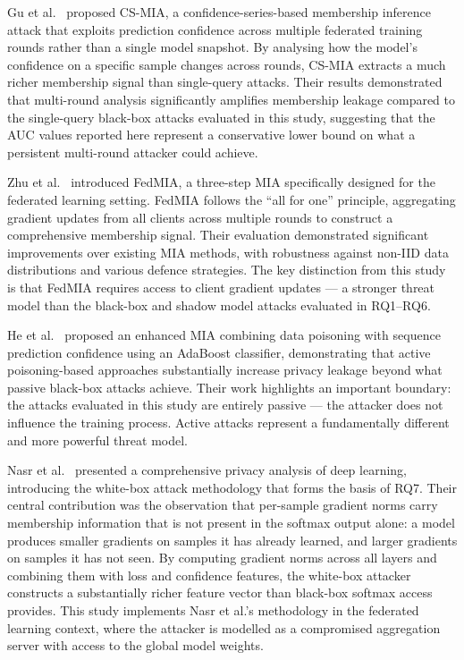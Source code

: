 \documentclass[12pt, a4paper]{report}
\begin{document}
Gu et al.~\cite{gu2022} proposed CS-MIA, a confidence-series-based membership
inference attack that exploits prediction confidence across multiple federated
training rounds rather than a single model snapshot. By analysing how the model's
confidence on a specific sample changes across rounds, CS-MIA extracts a much
richer membership signal than single-query attacks. Their results demonstrated
that multi-round analysis significantly amplifies membership leakage compared to
the single-query black-box attacks evaluated in this study, suggesting that the
AUC values reported here represent a conservative lower bound on what a persistent
multi-round attacker could achieve.

Zhu et al.~\cite{zhu2024fedmia} introduced FedMIA, a three-step MIA specifically
designed for the federated learning setting. FedMIA follows the ``all for one''
principle, aggregating gradient updates from all clients across multiple rounds
to construct a comprehensive membership signal. Their evaluation demonstrated
significant improvements over existing MIA methods, with robustness against
non-IID data distributions and various defence strategies. The key distinction
from this study is that FedMIA requires access to client gradient updates --- a
stronger threat model than the black-box and shadow model attacks evaluated in
RQ1--RQ6.

He et al.~\cite{he2024} proposed an enhanced MIA combining data poisoning with
sequence prediction confidence using an AdaBoost classifier, demonstrating that
active poisoning-based approaches substantially increase privacy leakage beyond
what passive black-box attacks achieve. Their work highlights an important
boundary: the attacks evaluated in this study are entirely passive --- the
attacker does not influence the training process. Active attacks represent a
fundamentally different and more powerful threat model.

Nasr et al.~\cite{nasr2019comprehensive} presented a comprehensive privacy
analysis of deep learning, introducing the white-box attack methodology that
forms the basis of RQ7. Their central contribution was the observation that
per-sample gradient norms carry membership information that is not present in
the softmax output alone: a model produces smaller gradients on samples it has
already learned, and larger gradients on samples it has not seen. By computing
gradient norms across all layers and combining them with loss and confidence
features, the white-box attacker constructs a substantially richer feature vector
than black-box softmax access provides. This study implements Nasr et al.'s
methodology in the federated learning context, where the attacker is modelled as
a compromised aggregation server with access to the global model weights.
\end{document}

